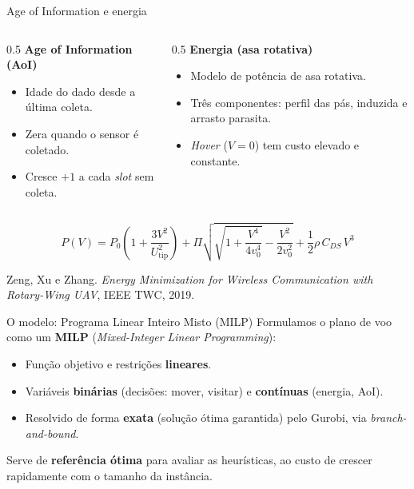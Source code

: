 \documentclass[aspectratio=169,11pt]{beamer}
\begin{document}
\begin{frame}{Age of Information e energia}
  \begin{columns}[T]
    \begin{column}{0.5\textwidth}
      \textbf{Age of Information (AoI)}
      \begin{itemize}
        \item Idade do dado desde a última coleta.
        \item Zera quando o sensor é coletado.
        \item Cresce $+1$ a cada \emph{slot} sem coleta.
      \end{itemize}
    \end{column}
    \begin{column}{0.5\textwidth}
      \textbf{Energia (asa rotativa)}
      \begin{itemize}
        \item Modelo de potência de asa rotativa.
        \item Três componentes: perfil das pás, induzida e arrasto parasita.
        \item \emph{Hover} ($V=0$) tem custo elevado e constante.
      \end{itemize}
    \end{column}
  \end{columns}
  \vspace{0.4em}
  {\small
  \[
    P(V) = P_0\!\left(1 + \frac{3V^2}{U_{\text{tip}}^2}\right)
    + \Pi\sqrt{\sqrt{1 + \frac{V^4}{4v_0^4}} - \frac{V^2}{2v_0^2}}
    + \frac{1}{2}\rho\,C_{DS}\,V^3
  \]}
  {\tiny\centering Zeng, Xu e Zhang. \emph{Energy Minimization for Wireless Communication with Rotary-Wing UAV}, IEEE TWC, 2019.\par}
\end{frame}

\begin{frame}{O modelo: Programa Linear Inteiro Misto (MILP)}
  Formulamos o plano de voo como um \textbf{MILP} (\emph{Mixed-Integer Linear Programming}):
  \begin{itemize}
    \item Função objetivo e restrições \textbf{lineares}.
    \item Variáveis \textbf{binárias} (decisões: mover, visitar) e \textbf{contínuas} (energia, AoI).
    \item Resolvido de forma \textbf{exata} (solução ótima garantida) pelo Gurobi, via \emph{branch-and-bound}.
  \end{itemize}
  \vspace{0.4em}
  Serve de \textbf{referência ótima} para avaliar as heurísticas, ao custo de crescer rapidamente com o tamanho da instância.
\end{frame}
\end{document}
